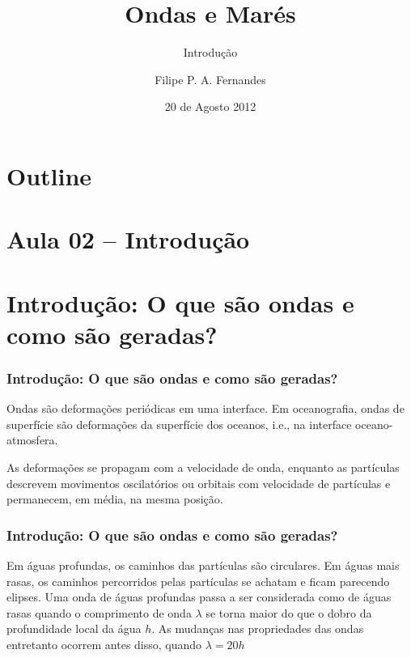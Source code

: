 \documentclass[handout,14pt,xcolor=dvipsnames]{beamer}
\title[Aula 02]{Ondas e Marés}
\subtitle{Introdução}
\author[Filipe Fernandes]{Filipe P. A. Fernandes}
\institute[unimonte]{Centro Universitário Monte Serrat}
\date[Agosto 2012]{20 de Agosto 2012}
\begin{document}
\begin{frame}[plain]
  \titlepage
\end{frame}

\section*{Outline}
\begin{frame}
\tableofcontents
\end{frame}

\section{Aula 02 -- Introdução}
\section{{Introdução: O que são ondas e como são geradas?}}
\begin{frame}
\frametitle{Introdução: O que são ondas e como são geradas?}
    \begin{block}{}
    Ondas são deformações periódicas em uma interface.  Em oceanografia, ondas
    de superfície são deformações da superfície dos oceanos, i.e., na interface
    oceano-atmosfera.

    As deformações se propagam com a velocidade de onda,
    enquanto as partículas descrevem movimentos oscilatórios ou orbitais com
    velocidade de partículas e permanecem, em média, na mesma posição.
    \end{block}
\end{frame}

\begin{frame}
\frametitle{Introdução: O que são ondas e como são geradas?}
    \begin{block}{}
    Em águas profundas, os caminhos das partículas são circulares. Em águas
    mais rasas, os caminhos percorridos pelas partículas se achatam e ficam
    parecendo elipses.  Uma onda de águas profundas passa a ser considerada
    como de águas rasas quando o comprimento de onda $\lambda$ se torna maior
    do que o dobro da profundidade local da água $h$.  As mudanças nas
    propriedades das ondas entretanto ocorrem antes disso, quando
    $\lambda = 20 h$
    \end{block}
\end{frame}
\end{document}
